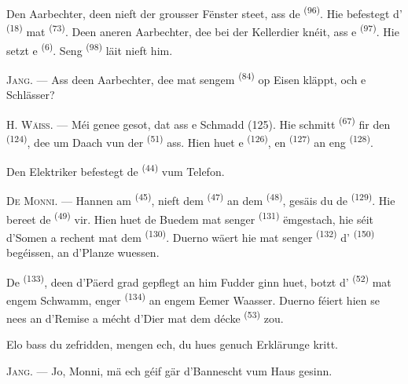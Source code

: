 Den Aarbechter, deen nieft der grousser Fënster steet, ass de 
\textsuperscript{(96)}. Hie befestegt d'
\textsuperscript{(18)} mat  \textsuperscript{(73)}. Deen aneren
Aarbechter, dee bei der Kellerdier knéit, ass e 
\textsuperscript{(97)}. Hie setzt e  \textsuperscript{(6)}. Seng
 \textsuperscript{(98)} läit nieft him.

\textsc{Jang}. --- Ass deen Aarbechter, dee mat sengem 
\textsuperscript{(84)} op Eisen kläppt, och e Schlässer?

H. \textsc{Wäiss}. --- Méi genee gesot, dat ass e Schmadd (125). Hie schmitt
 \textsuperscript{(67)} fir den 
\textsuperscript{(124)}, dee um Daach vun der  \textsuperscript{(51)}
ass. Hien huet e  \textsuperscript{(126)}, en 
\textsuperscript{(127)} an eng  \textsuperscript{(128)}.

Den Elektriker befestegt de  \textsuperscript{(44)}  vum
Telefon.

\VUsaut{3.0mm}

\textsc{De Monni}. --- Hannen am  \textsuperscript{(45)}, nieft dem
 \textsuperscript{(47)} an dem  \textsuperscript{(48)},
gesäis du de  \textsuperscript{(129)}. Hie bereet de
 \textsuperscript{(49)} vir. Hien huet de Buedem mat senger
 \textsuperscript{(131)} ëmgestach, hie séit d'Somen a rechent mat dem
 \textsuperscript{(130)}. Duerno wäert hie mat senger
 \textsuperscript{(132)} d' \textsuperscript{(150)}
begéissen, an d'Planze wuessen.

De  \textsuperscript{(133)}, deen d'Päerd grad gepflegt an him
Fudder ginn huet, botzt d' \textsuperscript{(52)} mat engem Schwamm,
enger  \textsuperscript{(134)} an engem Eemer Waasser. Duerno féiert
hien se nees an d'Remise a mécht d'Dier mat dem décke 
\textsuperscript{(53)} zou.

Elo bass du zefridden, mengen ech, du hues genuch Erklärunge kritt.

\textsc{Jang}. --- Jo, Monni, mä ech géif gär d'Bannescht vum Haus gesinn.

